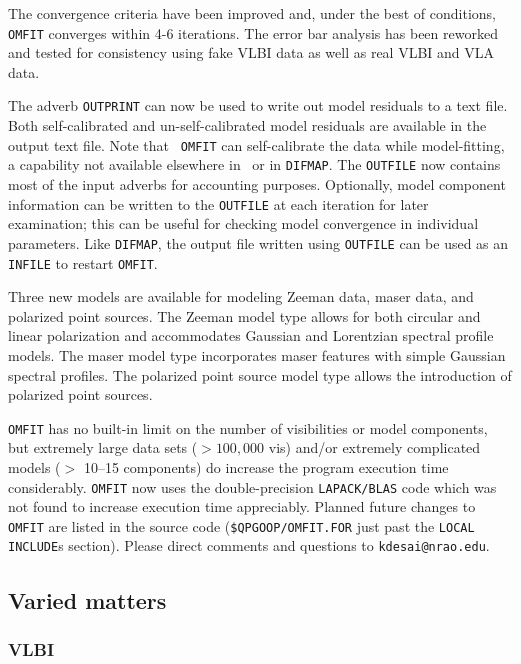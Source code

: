 The convergence criteria have been improved and, under the best of
conditions, {\tt OMFIT} converges within 4-6 iterations.  The error
bar analysis has been reworked and tested for consistency using fake
VLBI data as well as real VLBI and VLA data.

The adverb {\tt OUTPRINT} can now be used to write out model residuals
to a text file.  Both self-calibrated and un-self-calibrated model
residuals are available in the output text file.  Note that {\tt
OMFIT} can self-calibrate the data while model-fitting, a capability
not available elsewhere in \AIPS\ or in \hbox{{\tt DIFMAP}}.  The
{\tt OUTFILE} now contains most of the input adverbs for accounting
purposes.  Optionally, model component information can be written
to the {\tt OUTFILE} at each iteration for later examination; this can
be useful for checking model convergence in individual parameters.
Like {\tt DIFMAP}, the output file written using {\tt OUTFILE} can be
used as an {\tt INFILE} to restart \hbox{{\tt OMFIT}}.

Three new models are available for modeling Zeeman data, maser data,
and polarized point sources.  The Zeeman model type allows for both
circular and linear polarization and accommodates Gaussian and
Lorentzian spectral profile models.  The maser model type incorporates
maser features with simple Gaussian spectral profiles.  The polarized
point source model type allows the introduction of polarized point
sources.

{\tt OMFIT} has no built-in limit on the number of visibilities or
model components, but extremely large data sets ($>100,000$ vis)
and/or extremely complicated models ($>$ 10--15 components) do
increase the program execution time considerably.  {\tt OMFIT} now
uses the double-precision {\tt LAPACK/BLAS} code which was not found
to increase execution time appreciably.  Planned future changes to
{\tt OMFIT} are listed in the source code ({\tt \$QPGOOP/OMFIT.FOR}
just past the {\tt LOCAL INCLUDE}s section).   Please direct comments
and questions to {\tt kdesai@nrao.edu}.
\vfill\eject

\subsection{Varied matters}

\subsubsection{VLBI}

